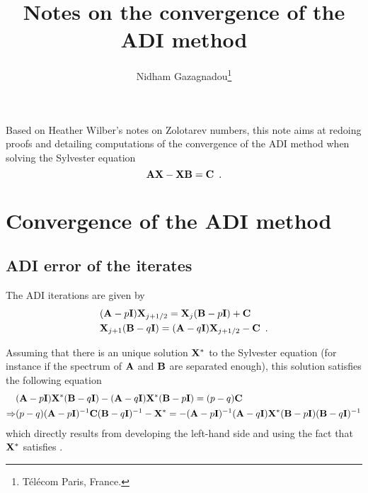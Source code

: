 \documentclass[10pt]{article}
\title{\bf Notes on the convergence of the ADI method}
\author{Nidham Gazagnadou\footnote{T\'{e}l\'{e}com Paris, France.}}
\makeatletter
\renewcommand*{\eqref}[1]{%
  \hyperref[{#1}]{\textup{\tagform@{\ref*{#1}}}}%
}
\theoremstyle{definition}
\makeatother
\begin{document}
\maketitle


Based on Heather Wilber's notes on Zolotarev numbers, this note aims at redoing proofs and detailing computations of the convergence of the ADI method when solving the Sylvester equation
\begin{equation}
    \label{eq:Sylvester_eq}
    {\bf A} {\bf X} - {\bf X} {\bf B} = {\bf C} \enspace .
\end{equation}

\section{Convergence of the ADI method}

\subsection{ADI error of the iterates}

The ADI iterations are given by
\begin{align}
    &({\bf A} - p {\bf I}) {\bf X}_{j+1/2} = {\bf X}_{j}({\bf B} - p {\bf I}) + {\bf C}  \label{eq:adi_1st_step} \\
    &{\bf X}_{j+1}({\bf B} - q {\bf I}) = ({\bf A} - q {\bf I}){\bf X}_{j+1/2} - {\bf C} \label{eq:adi_2nd_step} \enspace.
\end{align}

Assuming that there is an unique solution ${\bf X}^*$ to the Sylvester equation \eqref{eq:Sylvester_eq} (for instance if the spectrum of ${\bf A}$ and ${\bf B}$ are separated enough), this solution satisfies the following equation
\begin{align}
    &({\bf A} - p {\bf I}) {\bf X}^* ({\bf B} - q {\bf I}) - ({\bf A} - q {\bf I}) {\bf X}^* ({\bf B} - p {\bf I}) = (p-q) {\bf C} \nonumber \\
    \Rightarrow &(p-q) ({\bf A} - p {\bf I})^{-1} {\bf C} ({\bf B} - q {\bf I})^{-1} - {\bf X}^* = -({\bf A} - p {\bf I})^{-1} ({\bf A} - q {\bf I}) {\bf X}^* ({\bf B} - p {\bf I}) ({\bf B} - q {\bf I})^{-1} \label{eq:solution_characteristic}
\end{align}
which directly results from developing the left-hand side and using the fact that ${\bf X}^*$ satisfies \eqref{eq:Sylvester_eq}.
\end{document}
